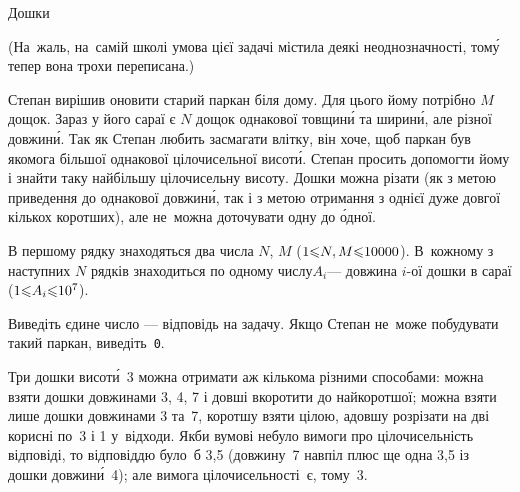 ﻿\begin{problemAllDefault}{Дошки}

\begin{footnotesize}

(На~жаль, на~самій школі умова цієї задачі містила деякі неоднозначності, том\'{у} тепер вона трохи переписана.)

\end{footnotesize}

Степан вирішив оновити старий паркан біля дому. Для цього йому потрібно $M$ дощок. Зараз у його сараї є $N$ дощок однакової товщин\'{и} та ширин\'{и}, але різної довжин\'{и}. Так як Степан любить засмагати влітку, він хоче, щоб паркан був якомога більшої однакової цілочисельної висот\'{и}. Степан просить допомогти йому і знайти таку найбільшу цілочисельну висоту. Дошки можна різати (як з метою приведення до однакової довжин\'{и}, так і з метою отримання з однієї дуже довгої кількох коротших), але не~можна доточувати одну до \'{о}дної.

\InputFile
В першому рядку знаходяться два числа $N$, $M$ ($1{\leqslant}N,M{\leqslant}10000$). В~кожному з наступних $N$ рядків знаходиться по одному числу\nolinebreak[3] $A_i$\nolinebreak[3] --- довжина \mbox{$i$-ої} дошки в сараї ($1{\leqslant}A_i{\leqslant}10^7$).


\OutputFile
Виведіть єдине число --- відповідь на задачу. Якщо Степан не~може побудувати такий паркан, виведіть~\verb"0".

\Example

\begin{example}
%
\end{example}

\Note
Три дошки висот\'{и}~3 можна отримати аж кількома різними способами: можна взяти дошки довжинами 3, 4, 7 і довші вкоротити до найкоротшої; можна взяти лише дошки довжинами 3 та~7, коротшу взяти цілою, а\nolinebreak[3] довшу розрізати на дві корисні по~3 і 1 у~відходи. Якби в\nolinebreak[3] умові не\nolinebreak[3] було вимоги про цілочисельність відповіді, то відповіддю було~б 3,5 (довжину~7 навпіл плюс ще одна 3,5 із дошки довжин\'{и}~4); але вимога цілочисельності~є, тому~3.

\end{problemAllDefault}

